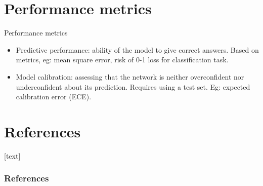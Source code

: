 \documentclass[9pt]{beamer}
\begin{document}
\section{Performance metrics}


\begin{frame}{Performance metrics}
\begin{itemize}
	\item \alert{Predictive performance}: ability of the model to give correct answers. Based on metrics, eg: mean square error, risk of 0-1 loss for classification task.
	\item \alert{Model calibration}: assessing that the network is neither overconfident nor underconfident about its prediction. Requires using a test set. Eg: expected calibration error (ECE).
\end{itemize}
\end{frame}


\section*{References}
[text]%
\begin{frame}[allowframebreaks]
\frametitle{References}
\small
\printbibliography
\normalsize
\end{frame}
\end{document}
